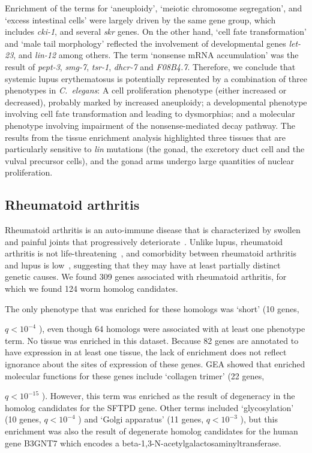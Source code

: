 \documentclass[10pt,letterpaper,twocolumn]{article}
\newcommand{\cel}{\emph{C.~elegans}}
\newcommand{\harthritis}{309}
\newcommand{\warthritis}{124}
\newcommand{\qval}[1]{
                      \ensuremath{
                                  q<10^{-#1}
                                  }
                      }
\begin{document}
Enrichment of the terms for `aneuploidy', `meiotic chromosome segregation',
and `excess intestinal cells' were largely driven by the same gene group, which
includes \emph{cki-1}, and several \emph{skr} genes. On the other hand, `cell
fate transformation' and `male tail morphology' reflected the involvement of
developmental genes \emph{let-23}, and \emph{lin-12} among others. The term
`nonsense mRNA accumulation' was the result of \emph{pept-3}, \emph{smg-7},
\emph{tsr-1}, \emph{dhcr-7} and \emph{F08B4.7}. Therefore, we conclude that
systemic lupus erythematosus is potentially represented by a combination of three
phenotypes in \cel{}: A cell proliferation phenotype (either increased or
decreased), probably marked by increased
aneuploidy; a developmental phenotype involving cell fate transformation and
leading to dysmorphias; and a molecular phenotype involving impairment of the
nonsense-mediated decay pathway.
The results from the tissue enrichment analysis
highlighted three tissues that are particularly sensitive to \emph{lin} mutations
(the gonad, the excretory duct cell and the vulval precursor cells),
and the gonad arms undergo large quantities of nuclear proliferation.

\subsection*{Rheumatoid arthritis}
Rheumatoid arthritis is an auto-immune disease that is characterized by
swollen and painful joints that progressively deteriorate~\cite{}. Unlike lupus,
rheumatoid arthritis is not life-threatening~\cite{}, and comorbidity between rheumatoid
arthritis and lupus is low~\cite{}, suggesting that they may have at least
partially distinct genetic causes. We found \harthritis{} genes associated with
rheumatoid arthritis, for which we found \warthritis{} worm homolog candidates.

The only phenotype that was enriched for these homologs was `short' (10 genes,
\qval{4}), even though 64 homologs were associated with at least
one phenotype term. No tissue was enriched in this dataset. Because
82 genes are annotated to have expression in at least one tissue, the lack of
enrichment does not reflect ignorance about the sites of expression of these
genes. GEA showed that enriched
molecular functions for these genes include `collagen trimer' (22 genes,
\qval{15}). However, this term was enriched as the result of degeneracy in the
homolog candidates for the SFTPD gene. Other terms included
 `glycosylation' (10 genes, \qval{4}) and `Golgi apparatus' (11
genes, \qval{3}), but this enrichment was also the result of degenerate homolog
candidates for the human gene B3GNT7 which encodes a
beta-1,3-N-acetylgalactosaminyltransferase.
\end{document}
